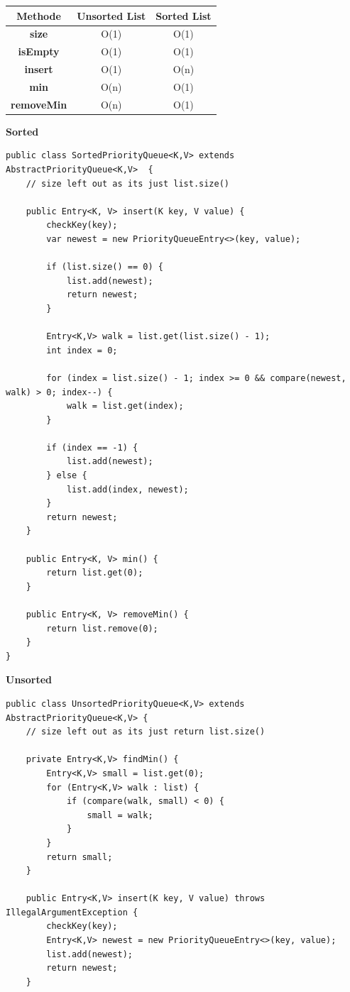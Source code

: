 \begin{multicols*}{4}
		\begin{tabular}{c | c | c}
			\textbf{Methode} & \textbf{Unsorted List} & \textbf{Sorted List} \\
			\hline
			\textbf{size} & O(1) & O(1) \\
			\textbf{isEmpty} & O(1) & O(1) \\
			\textbf{insert} & O(1) & O(n) \\
			\textbf{min} & O(n) & O(1) \\
			\textbf{removeMin} & O(n) & O(1) \\
		\end{tabular}
	
	\vspace{3pt}
	\textbf{Sorted}
	\begin{lstlisting}
public class SortedPriorityQueue<K,V> extends AbstractPriorityQueue<K,V>  {
	// size left out as its just list.size()
	
	public Entry<K, V> insert(K key, V value) {		
		checkKey(key);
		var newest = new PriorityQueueEntry<>(key, value);
		
		if (list.size() == 0) {
			list.add(newest);
			return newest;
		}
		
		Entry<K,V> walk = list.get(list.size() - 1);
		int index = 0;
		
		for (index = list.size() - 1; index >= 0 && compare(newest, walk) > 0; index--) {
			walk = list.get(index);	
		}
		
		if (index == -1) {
			list.add(newest);
		} else {
			list.add(index, newest);
		}
		return newest;
	}
	
	public Entry<K, V> min() {
		return list.get(0);
	}
	
	public Entry<K, V> removeMin() {
		return list.remove(0);
	}
}
	\end{lstlisting}

\textbf{Unsorted}
	\begin{lstlisting}
public class UnsortedPriorityQueue<K,V> extends AbstractPriorityQueue<K,V> {
	// size left out as its just return list.size()
	
	private Entry<K,V> findMin() {
		Entry<K,V> small = list.get(0);
		for (Entry<K,V> walk : list) {
			if (compare(walk, small) < 0) {
				small = walk;
			}
		}
		return small;
	}
	
	public Entry<K,V> insert(K key, V value) throws IllegalArgumentException {
		checkKey(key);
		Entry<K,V> newest = new PriorityQueueEntry<>(key, value);
		list.add(newest);
		return newest;
	}
	\end{lstlisting}
	

\end{multicols*}
